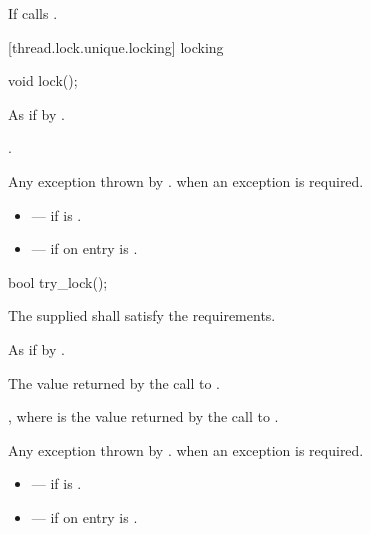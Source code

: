 \begin{itemdescr}
\pnum\effects If  calls .
\end{itemdescr}

[thread.lock.unique.locking]{ locking}

%
\begin{itemdecl}
void lock();
\end{itemdecl}

\begin{itemdescr}
\pnum
\effects As if by .

\pnum
\postconditions {}.

\pnum
\throws
Any exception thrown by .  when an exception
is required.

\pnum
\errors
\begin{itemize}
\item {} --- if  is .
\item {} --- if on entry 
is .
\end{itemize}
\end{itemdescr}

%
\begin{itemdecl}
bool try_lock();
\end{itemdecl}

\begin{itemdescr}
\pnum
\requires The supplied  shall satisfy the 
requirements.

\pnum
\effects As if by .

\pnum\returns The value returned by the call to .

\pnum
\postconditions {}, where  is the value returned by
the call to .

\pnum
\throws
Any exception thrown by .  when an exception
is required.

\pnum
\errors
\begin{itemize}
\item {} --- if  is .
\item {} --- if on entry 
is .
\end{itemize}
\end{itemdescr}

